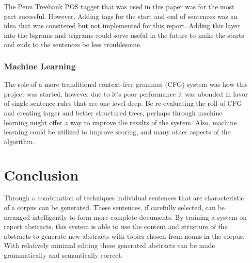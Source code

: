 \documentclass[letterpaper, 10 pt, conference]{ieeeconf}  %
\begin{document}
The Penn Treebank POS tagger that was used in this paper was for the most part sucessful. However, Adding tags for the start and end of sentences was an idea that was consitered but not implemented for this report. Adding this layer into the bigrams and trigrams could serve useful in the future to make the starts and ends to the sentences be less troublesome.

\subsubsection{Machine Learning}

The role of a more tranditional context-free grammar (CFG) system was how this project was started, however due to it's poor performance it was abonded in favor of single-sentence rules that are one level deep. Be re-evaluating the roll of CFG and creating larger and better structured trees, perhaps through machine learning might offer a way to improve the results of the system. Also, machine learning could be utilized to improve scoring, and many other aspects of the algorithm.

\section{Conclusion}

Through a combination of techniques individual sentences that are characteristic of a corpus can be generated. These sentences, if carefully selected, can be arranged intelligently to form more complete documents. By training a system on report abstracts, this system is able to use the content and structure of the abstracts to generate new abstracts with topics chosen from nouns in the corpus. With relatively minimal editing these generated abstracts can be made grammatically and semantically correct.

\addtolength{\textheight}{-12cm}   %

\end{document}
